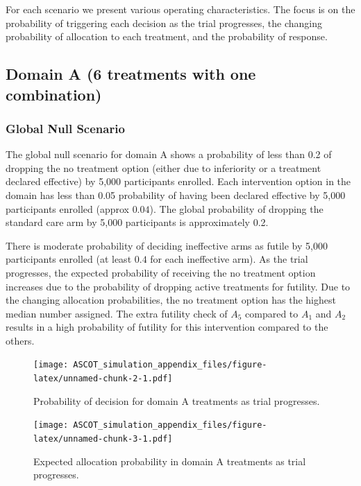 \documentclass[
]{article}
\begin{document}
For each scenario we present various operating characteristics.
The focus is on the probability of triggering each decision as the trial progresses, the changing probability of allocation to each treatment, and the probability of response.

\hypertarget{domain-a-6-treatments-with-one-combination}{%
\subsection{Domain A (6 treatments with one combination)}\label{domain-a-6-treatments-with-one-combination}}

\hypertarget{global-null-scenario}{%
\subsubsection{Global Null Scenario}\label{global-null-scenario}}

The global null scenario for domain A shows a probability of less than 0.2 of dropping the no treatment option (either due to inferiority or a treatment declared effective) by 5,000 participants enrolled.
Each intervention option in the domain has less than 0.05 probability of having been declared effective by 5,000 participants enrolled (approx \(0.04\)).
The global probability of dropping the standard care arm by 5,000 participants is approximately 0.2.

There is moderate probability of deciding ineffective arms as futile by 5,000 participants enrolled (at least \(0.4\) for each ineffective arm).
As the trial progresses, the expected probability of receiving the no treatment option increases due to the probability of dropping active treatments for futility.
Due to the changing allocation probabilities, the no treatment option has the highest median number assigned.
The extra futility check of \(A_5\) compared to \(A_1\) and \(A_2\) results in a high probability of futility for this intervention compared to the others.

\begin{figure}
\centering
\texttt{[image: ASCOT\_simulation\_appendix\_files/figure-latex/unnamed-chunk-2-1.pdf]}
\caption{\label{fig:unnamed-chunk-2}Probability of decision for domain A treatments as trial progresses.}
\end{figure}

\begin{figure}
\centering
\texttt{[image: ASCOT\_simulation\_appendix\_files/figure-latex/unnamed-chunk-3-1.pdf]}
\caption{\label{fig:unnamed-chunk-3}Expected allocation probability in domain A treatments as trial progresses.}
\end{figure}
\end{document}
